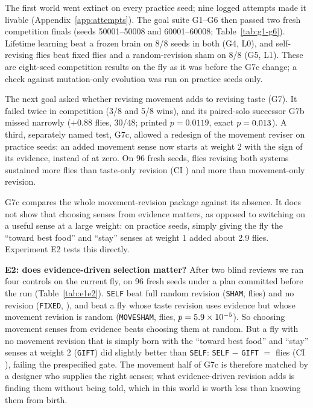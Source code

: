 \documentclass[11pt]{article}
\begin{document}
The first world went extinct on every practice seed; nine logged attempts made it livable (Appendix~\ref{app:attempts}). The goal suite G1--G6 then passed two fresh competition finals (seeds 50001--50008 and 60001--60008; Table~\ref{tab:g1-g6}). Lifetime learning beat a frozen brain on 8/8 seeds in both (G4, L0), and self-revising flies beat fixed flies and a random-revision sham on 8/8 (G5, L1). These are eight-seed competition results on the fly as it was before the G7c change; a check against mutation-only evolution was run on practice seeds only.

The next goal asked whether revising movement adds to revising taste (G7). It failed twice in competition (3/8 and 5/8 wins), and its paired-solo successor G7b missed narrowly ($+0.88$ flies, 30/48; printed $p=0.0119$, exact $p = 0.013$). A third, separately named test, G7c, allowed a redesign of the movement reviser on practice seeds: an added movement sense now starts at weight 2 with the sign of its evidence, instead of at zero. On 96 fresh seeds, flies revising both systems sustained \GsevenCTasteMean{} more flies than taste-only revision (CI \GsevenCTasteCI) and \GsevenCMoveMean{} more than movement-only revision.

G7c compares the whole movement-revision package against its absence. It does not show that choosing senses from evidence matters, as opposed to switching on a useful sense at a large weight: on practice seeds, simply giving the fly the ``toward best food'' and ``stay'' senses at weight 1 added about 2.9 flies. Experiment E2 tests this directly.

\textbf{E2: does evidence-driven selection matter?} After two blind reviews we ran four controls on the current fly, on 96 fresh seeds under a plan committed before the run (Table~\ref{tab:e1e2}). \texttt{SELF} beat full random revision (\texttt{SHAM}, \EtwoShamMean{} flies) and no revision (\texttt{FIXED}, \EtwoFixedMean), and beat a fly whose taste revision uses evidence but whose movement revision is random (\texttt{MOVESHAM}, \EtwoMoveshamMean{} flies, $p = 5.9 \times 10^{-5}$). So choosing movement senses from evidence beats choosing them at random. But a fly with no movement revision that is simply born with the ``toward best food'' and ``stay'' senses at weight 2 (\texttt{GIFT}) did slightly better than \texttt{SELF}: \texttt{SELF} $-$ \texttt{GIFT} $=$ \EtwoGiftMean{} flies (CI \EtwoGiftCI), failing the prespecified gate. The movement half of G7c is therefore matched by a designer who supplies the right senses; what evidence-driven revision adds is finding them without being told, which in this world is worth less than knowing them from birth.
\end{document}
